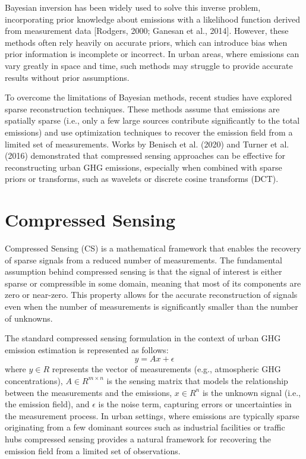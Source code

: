 Bayesian inversion has been widely used to solve this inverse problem, incorporating prior knowledge about emissions with a likelihood function derived from measurement data [Rodgers, 2000; Ganesan et al., 2014].
However, these methods often rely heavily on accurate priors, which can introduce bias when prior information is incomplete or incorrect.
In urban areas, where emissions can vary greatly in space and time, such methods may struggle to provide accurate results without prior assumptions.

To overcome the limitations of Bayesian methods, recent studies have explored sparse reconstruction techniques.
These methods assume that emissions are spatially sparse (i.e., only a few large sources contribute significantly to the total emissions) and use optimization techniques to recover the emission field from a limited set of measurements.
Works by Benisch et al. (2020) and Turner et al. (2016) demonstrated that compressed sensing approaches can be effective for reconstructing urban GHG emissions, especially when combined with sparse priors or transforms, such as wavelets or discrete cosine transforms (DCT).



\section{Compressed Sensing}
Compressed Sensing (CS) is a mathematical framework that enables the recovery of sparse signals from a reduced number of measurements.
The fundamental assumption behind compressed sensing is that the signal of interest is either sparse or compressible in some domain, meaning that most of its components are zero or near-zero.
This property allows for the accurate reconstruction of signals even when the number of measurements is significantly smaller than the number of unknowns.

The standard compressed sensing formulation in the context of urban GHG emission estimation is represented as follows:
\begin{equation}
    y = A x + \epsilon
\end{equation}
where $y \in R$ represents the vector of measurements (e.g., atmospheric GHG concentrations), $A \in R^{m \times n}$ is the sensing matrix that models the relationship between the measurements and the emissions, $x \in R^n$ is the unknown signal (i.e., the emission field), and $\epsilon$ is the noise term, capturing errors or uncertainties in the measurement process.
In urban settings, where emissions are typically sparse originating from a few dominant sources such as industrial facilities or traffic hubs compressed sensing provides a natural framework for recovering the emission field from a limited set of observations.

